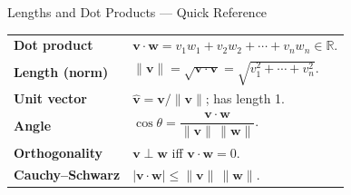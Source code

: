 \begin{toolkitbox}{Lengths and Dot Products --- Quick Reference}
\begin{tabular}{@{}p{}p{}@{}}
\textbf{Dot product}     & $\mathbf{v} \cdot \mathbf{w} = v_1w_1 + v_2w_2 + \cdots + v_nw_n \in \mathbb{R}$. \\[4pt]
\textbf{Length (norm)}   & $\|\mathbf{v}\| = \sqrt{\mathbf{v} \cdot \mathbf{v}} = \sqrt{v_1^2 + \cdots + v_n^2}$. \\[4pt]
\textbf{Unit vector}     & $\hat{\mathbf{v}} = \mathbf{v}/\|\mathbf{v}\|$; has length 1. \\[4pt]
\textbf{Angle}           & $\cos\theta = \dfrac{\mathbf{v} \cdot \mathbf{w}}{\|\mathbf{v}\|\,\|\mathbf{w}\|}$. \\[6pt]
\textbf{Orthogonality}   & $\mathbf{v} \perp \mathbf{w}$ iff $\mathbf{v} \cdot \mathbf{w} = 0$. \\[4pt]
\textbf{Cauchy--Schwarz} & $|\mathbf{v} \cdot \mathbf{w}| \leq \|\mathbf{v}\|\,\|\mathbf{w}\|$. \\
\end{tabular}
\end{toolkitbox}






